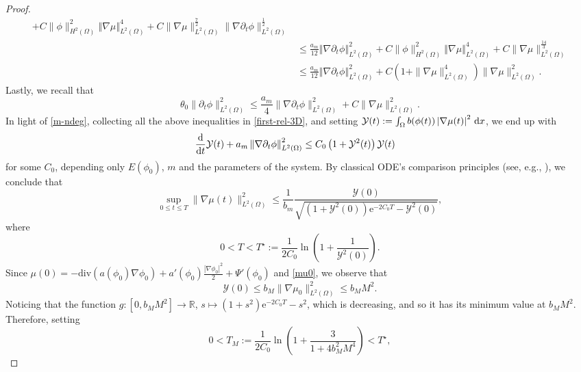 \documentclass[11pt,reqno]{amsart}
\theoremstyle{remark}
\newcommand \norm[1] {\left\Vert #1\right\Vert}
\def\d{{\rm d}}
\def\ddt{\frac{\d}{\d t}}
\def\div{\mathrm{div}}
\numberwithin{equation}{section}
\def\d{{\rm d}}
\begin{document}
\begin{proof}
\begin{align*}
+C\| \phi\|_{H^2(\Omega)}^2\norm{\nabla \mu}_{L^2(\Omega)}^4
+C\| \nabla \mu\|_{L^2(\Omega)}^\frac72 \| \nabla \partial_t \phi\|_{L^2(\Omega)}^\frac12
\\
&\leq \frac{a_m}{12}\norm{ \nabla\partial_t \phi }_{L^2(\Omega)}^2
+C\| \phi\|_{H^2(\Omega)}^2\norm{\nabla \mu}_{L^2(\Omega)}^4+
C \| \nabla \mu\|_{L^2(\Omega)}^\frac{14}{3}
\\
&\leq \frac{a_m}{12}\norm{ \nabla\partial_t \phi }_{L^2(\Omega)}^2+
C \left( 1+ \| \nabla \mu\|_{L^2(\Omega)}^4\right)
 \| \nabla \mu\|_{L^2(\Omega)}^2.
\end{align*}
Lastly, we recall that
$$
\theta_0 \|\partial_t \phi \|_{L^2(\Omega)}^2 
\leq \frac{a_m}{4} \| \nabla \partial_t \phi\|_{L^2(\Omega)}^2 +
C \| \nabla \mu\|_{L^2(\Omega)}^2.
$$
In light of \eqref{m-ndeg}, collecting all the above inequalities in \eqref{first-rel-3D},  and setting $\mathcal{Y}(t):=\int_{\Omega} b(\phi(t))\left|\nabla \mu(t) \right|^2 \, \d x$, we end up with
\begin{align}
\label{final-3D}
& \ddt  \mathcal{Y}(t)
 + a_m
 \norm{\nabla \partial_t \phi}_{L^2(\Omega)}^2
\leq C_0\left(1+  \mathcal{Y}^2(t)
 \right) \mathcal{Y}(t)
\end{align}
for some $C_0$, depending only $E(\phi_0)$, $m$ and the parameters of the system.
By classical ODE's comparison principles (see, e.g., \cite[Lemma II.4.12]{BF2013}), we conclude that
\begin{equation*}
\sup_{0 \leq t \leq T} \|\nabla \mu (t)\|_{L^2(\Omega)}^2
\leq  \frac{1}{b_m} \frac{\mathcal{Y}(0)}{\sqrt{\left( 1+\mathcal{Y}^2(0) \right) \mathrm{e}^{-2C_0 T} -\mathcal{Y}^2(0) }},
\end{equation*}
where
$$
0 < T < T^\star:= \frac{1}{2C_0} \ln \left( 1 + \frac{1}{\mathcal{Y}^2(0)}\right).
$$
Since $
\mu(0)= -\div( a(\phi_0) \nabla \phi_0) + a'(\phi_0) \frac{|\nabla \phi_0|^2}{2}+\Psi'(\phi_0)
$ and \eqref{mu0}, we observe that 
$$
\mathcal{Y}(0)\leq b_M \| \nabla \mu_0\|_{L^2(\Omega)}^2\leq b_M M^2.
$$
Noticing that the function $g: [0,b_M M^2] \to \mathbb{R}$, $s \mapsto (1+s^2)\mathrm{e}^{- 2C_0 T} - s^2$, which is decreasing, and so it has its minimum value at $b_M M^2$. Therefore, setting
$$
0<T_M:= \frac{1}{2C_0} \ln \left( 1+ \frac{3}{1+4b_M^2 M^4}\right) < T^\star,
$$
\end{proof}
\end{document}
